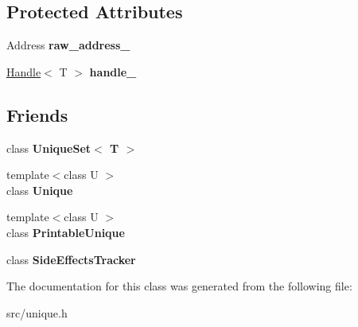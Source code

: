 \subsection*{Protected Attributes}
\begin{DoxyCompactItemize}
\item 
\hypertarget{classv8_1_1internal_1_1_unique_a4a89ca58fd5f53ce74a2e060cd23f375}{}Address {\bfseries raw\+\_\+address\+\_\+}\label{classv8_1_1internal_1_1_unique_a4a89ca58fd5f53ce74a2e060cd23f375}

\item 
\hypertarget{classv8_1_1internal_1_1_unique_a3390273429be2baccc86336d50ee3d18}{}\hyperlink{classv8_1_1internal_1_1_handle}{Handle}$<$ T $>$ {\bfseries handle\+\_\+}\label{classv8_1_1internal_1_1_unique_a3390273429be2baccc86336d50ee3d18}

\end{DoxyCompactItemize}
\subsection*{Friends}
\begin{DoxyCompactItemize}
\item 
\hypertarget{classv8_1_1internal_1_1_unique_a4ba9e3357ceb16f8c30303b10caad049}{}class {\bfseries Unique\+Set$<$ T $>$}\label{classv8_1_1internal_1_1_unique_a4ba9e3357ceb16f8c30303b10caad049}

\item 
\hypertarget{classv8_1_1internal_1_1_unique_a9df4cb329f44d42d59bc1d9cbcb07a16}{}{\footnotesize template$<$class U $>$ }\\class {\bfseries Unique}\label{classv8_1_1internal_1_1_unique_a9df4cb329f44d42d59bc1d9cbcb07a16}

\item 
\hypertarget{classv8_1_1internal_1_1_unique_a80961f9e38783ebcef26e842a45a69d9}{}{\footnotesize template$<$class U $>$ }\\class {\bfseries Printable\+Unique}\label{classv8_1_1internal_1_1_unique_a80961f9e38783ebcef26e842a45a69d9}

\item 
\hypertarget{classv8_1_1internal_1_1_unique_a79af41808690c90c6bc5a0ea5445945f}{}class {\bfseries Side\+Effects\+Tracker}\label{classv8_1_1internal_1_1_unique_a79af41808690c90c6bc5a0ea5445945f}

\end{DoxyCompactItemize}


The documentation for this class was generated from the following file\+:\begin{DoxyCompactItemize}
\item 
src/unique.\+h\end{DoxyCompactItemize}
